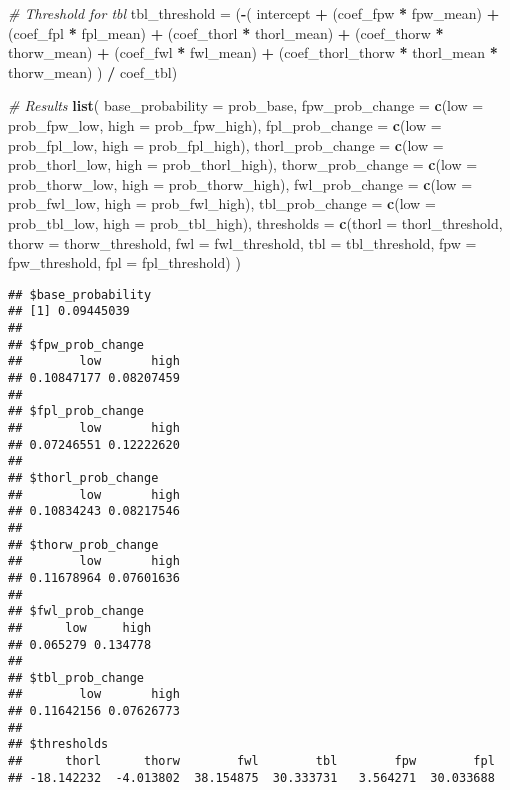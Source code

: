 \documentclass[
]{article}
\newenvironment{Shaded}{\begin{snugshade}}{\end{snugshade}}
\newcommand{\AttributeTok}[1]{\textcolor[rgb]{0.13,0.29,0.53}{#1}}
\newcommand{\CommentTok}[1]{\textcolor[rgb]{0.56,0.35,0.01}{\textit{#1}}}
\newcommand{\FunctionTok}[1]{\textcolor[rgb]{0.13,0.29,0.53}{\textbf{#1}}}
\newcommand{\NormalTok}[1]{#1}
\newcommand{\OtherTok}[1]{\textcolor[rgb]{0.56,0.35,0.01}{#1}}
\newcommand{\SpecialCharTok}[1]{\textcolor[rgb]{0.81,0.36,0.00}{\textbf{#1}}}
\begin{document}
\begin{Shaded}
\begin{Highlighting}[]
\CommentTok{\# Threshold for tbl}
\NormalTok{tbl\_threshold }\OtherTok{=}\NormalTok{ (}\SpecialCharTok{{-}}\NormalTok{(}
\NormalTok{  intercept }\SpecialCharTok{+} 
\NormalTok{  (coef\_fpw }\SpecialCharTok{*}\NormalTok{ fpw\_mean) }\SpecialCharTok{+} 
\NormalTok{  (coef\_fpl }\SpecialCharTok{*}\NormalTok{ fpl\_mean) }\SpecialCharTok{+} 
\NormalTok{  (coef\_thorl }\SpecialCharTok{*}\NormalTok{ thorl\_mean) }\SpecialCharTok{+} 
\NormalTok{  (coef\_thorw }\SpecialCharTok{*}\NormalTok{ thorw\_mean) }\SpecialCharTok{+} 
\NormalTok{  (coef\_fwl }\SpecialCharTok{*}\NormalTok{ fwl\_mean) }\SpecialCharTok{+} 
\NormalTok{  (coef\_thorl\_thorw }\SpecialCharTok{*}\NormalTok{ thorl\_mean }\SpecialCharTok{*}\NormalTok{ thorw\_mean)}
\NormalTok{) }\SpecialCharTok{/}\NormalTok{ coef\_tbl)}


\CommentTok{\# Results}
\FunctionTok{list}\NormalTok{(}
  \AttributeTok{base\_probability =}\NormalTok{ prob\_base,}
  \AttributeTok{fpw\_prob\_change =} \FunctionTok{c}\NormalTok{(}\AttributeTok{low =}\NormalTok{ prob\_fpw\_low, }\AttributeTok{high =}\NormalTok{ prob\_fpw\_high),}
  \AttributeTok{fpl\_prob\_change =} \FunctionTok{c}\NormalTok{(}\AttributeTok{low =}\NormalTok{ prob\_fpl\_low, }\AttributeTok{high =}\NormalTok{ prob\_fpl\_high),}
  \AttributeTok{thorl\_prob\_change =} \FunctionTok{c}\NormalTok{(}\AttributeTok{low =}\NormalTok{ prob\_thorl\_low, }\AttributeTok{high =}\NormalTok{ prob\_thorl\_high),}
  \AttributeTok{thorw\_prob\_change =} \FunctionTok{c}\NormalTok{(}\AttributeTok{low =}\NormalTok{ prob\_thorw\_low, }\AttributeTok{high =}\NormalTok{ prob\_thorw\_high),}
  \AttributeTok{fwl\_prob\_change =} \FunctionTok{c}\NormalTok{(}\AttributeTok{low =}\NormalTok{ prob\_fwl\_low, }\AttributeTok{high =}\NormalTok{ prob\_fwl\_high),}
  \AttributeTok{tbl\_prob\_change =} \FunctionTok{c}\NormalTok{(}\AttributeTok{low =}\NormalTok{ prob\_tbl\_low, }\AttributeTok{high =}\NormalTok{ prob\_tbl\_high),}
  \AttributeTok{thresholds =} \FunctionTok{c}\NormalTok{(}\AttributeTok{thorl =}\NormalTok{ thorl\_threshold, }\AttributeTok{thorw =}\NormalTok{ thorw\_threshold, }\AttributeTok{fwl =}\NormalTok{ fwl\_threshold, }\AttributeTok{tbl =}\NormalTok{ tbl\_threshold, }\AttributeTok{fpw =}\NormalTok{ fpw\_threshold, }\AttributeTok{fpl =}\NormalTok{ fpl\_threshold)}
\NormalTok{)}
\end{Highlighting}
\end{Shaded}

\begin{verbatim}
## $base_probability
## [1] 0.09445039
## 
## $fpw_prob_change
##        low       high 
## 0.10847177 0.08207459 
## 
## $fpl_prob_change
##        low       high 
## 0.07246551 0.12222620 
## 
## $thorl_prob_change
##        low       high 
## 0.10834243 0.08217546 
## 
## $thorw_prob_change
##        low       high 
## 0.11678964 0.07601636 
## 
## $fwl_prob_change
##      low     high 
## 0.065279 0.134778 
## 
## $tbl_prob_change
##        low       high 
## 0.11642156 0.07626773 
## 
## $thresholds
##      thorl      thorw        fwl        tbl        fpw        fpl 
## -18.142232  -4.013802  38.154875  30.333731   3.564271  30.033688
\end{verbatim}
\end{document}
